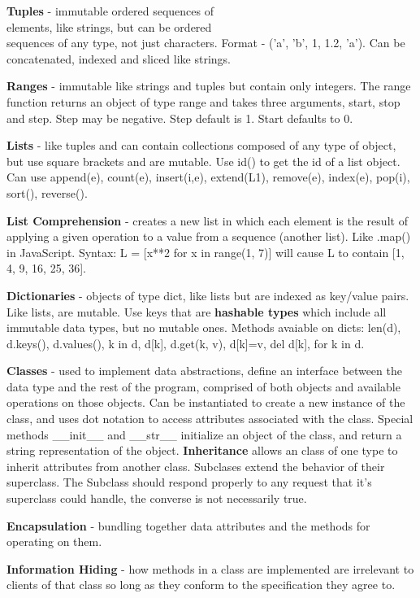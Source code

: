 \textbf{Tuples} - immutable ordered sequences of \\ elements, like strings, but can be ordered \\ sequences of any type, not just characters. Format - ('a', 'b', 1, 1.2, 'a'). Can be concatenated, indexed and sliced like strings.

\textbf{Ranges} - immutable like strings and tuples but contain only integers. The range function returns an object of type range and takes three arguments, start, stop and step. Step may be negative. Step default is 1. Start defaults to 0.

\textbf{Lists} - like tuples and can contain collections composed of any type of object, but use square brackets and are mutable. Use id() to get the id of a list object. Can use append(e), count(e), insert(i,e), extend(L1), remove(e), index(e), pop(i), sort(), reverse().

\textbf{List Comprehension} - creates a new list in which each element is the result of applying a given operation to a value from a sequence (another list). Like .map() in JavaScript. Syntax: L = [x**2 for x in range(1, 7)] will cause L to contain [1, 4, 9, 16, 25, 36].

\textbf{Dictionaries} - objects of type dict, like lists but are indexed as key/value pairs. Like lists, are mutable. Use keys that are \textbf{hashable types} which include all immutable data types, but no mutable ones. Methods avaiable on dicts: len(d), d.keys(), d.values(), k in d, d[k], d.get(k, v), d[k]=v, del d[k], for k in d.

\textbf{Classes} - used to implement data abstractions, define an interface between the data type and the rest of the program, comprised of both objects and available operations on those objects. Can be instantiated to create a new instance of the class, and uses dot notation to access attributes associated with the class. Special methods \_\_init\_\_ and \_\_str\_\_ initialize an object of the class, and return a string representation of the object. \textbf{Inheritance} allows an class of one type to inherit attributes from another class. Subclases extend the behavior of their superclass. The Subclass should respond properly to any request that it's superclass could handle, the converse is not necessarily true.

\textbf{Encapsulation} - bundling together data attributes and the methods for operating on them.

\textbf{Information Hiding} - how methods in a class are implemented are irrelevant to clients of that class so long as they conform to the specification they agree to.

